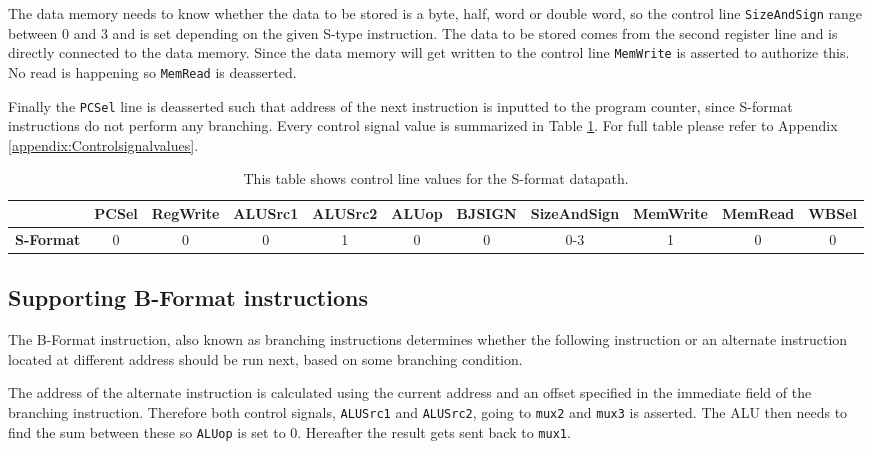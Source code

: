         The data memory needs to know whether the data to be stored is a byte, half, word or double word, so the control line \texttt{SizeAndSign} range between 0 and 3 and is set depending on the given S-type instruction. The data to be stored comes from the second register line and is directly connected to the data memory. Since the data memory will get written to the control line \texttt{MemWrite} is asserted to authorize this. No read is happening so \texttt{MemRead} is deasserted.
        
        Finally the \texttt{PCSel} line is deasserted such that address of the next instruction is inputted to the program counter, since S-format instructions do not perform any branching. Every control signal value is summarized in Table \ref{table:SFORMAT}. For full table please refer to Appendix \ref{appendix:Controlsignalvalues}.
        
        
        \begin{table}[h!]
            \small
            \hspace{-2.4cm}
            \begin{tabular}{|c||c|c|c|c|c|c|c|c|c|c|}
            	\hline
            	                  & \textbf{PCSel} & \textbf{RegWrite} & \textbf{ALUSrc1} & \textbf{ALUSrc2} & \textbf{ALUop} & \textbf{BJSIGN} & \textbf{SizeAndSign} & \textbf{MemWrite} & \textbf{MemRead} & \textbf{WBSel} \\ \hline\hline
            	\textbf{S-Format} &       0        &         0         &        0         &        1         &       0        &        0        &         0-3          &         1         &        0         &       0        \\ \hline
            \end{tabular}
            \caption{This table shows control line values for the S-format datapath.}
            \label{table:SFORMAT}
        \end{table}
    
    \subsection{Supporting B-Format instructions}
        The B-Format instruction, also known as branching instructions determines whether the following instruction or an alternate instruction located at different address should be run next, based on some branching condition.
        
        The address of the alternate instruction is calculated using the current address and an offset specified in the immediate field of the branching instruction. Therefore both control signals, \texttt{ALUSrc1} and \texttt{ALUSrc2}, going to \texttt{mux2} and \texttt{mux3} is asserted. The ALU then needs to find the sum between these so \texttt{ALUop} is set to 0. Hereafter the result gets sent back to \texttt{mux1}.
        
